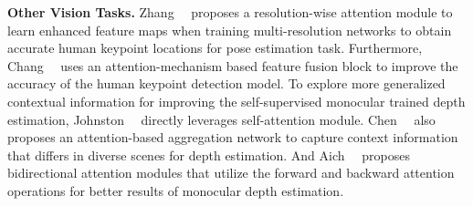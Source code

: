 \textbf{Other Vision Tasks.}
Zhang~\etal~ proposes a resolution-wise attention module to learn enhanced feature maps when training multi-resolution networks to obtain accurate human keypoint locations for pose estimation task. Furthermore, Chang~\etal~ uses an attention-mechanism based feature fusion block to improve the accuracy of the human keypoint detection model.
To explore more generalized contextual information for improving the self-supervised monocular trained depth estimation, Johnston~\etal~ directly leverages self-attention module. Chen~\etal~ also proposes an attention-based aggregation network to capture context information that differs in diverse scenes for depth estimation. And Aich~\etal~ proposes bidirectional attention modules that utilize the forward and backward attention operations for better results of monocular depth estimation.
\ifCLASSOPTIONcaptionsoff
  \newpage
\fi
\renewcommand\refname{References}
{\small


}
